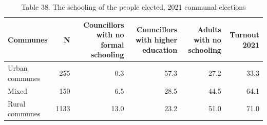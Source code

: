 \begin{table}
\caption{Table 38. The schooling of the people elected, 2021 communal elections}
\label{tab:T38_who_is_elected}
\begin{tabular}{lrrrrr}
\toprule
Communes & N & Councillors with no formal schooling & Councillors with higher education & Adults with no schooling & Turnout 2021 \\
\midrule
Urban communes & 255 & 0.3 & 57.3 & 27.2 & 33.3 \\
Mixed & 150 & 6.5 & 28.5 & 44.5 & 64.1 \\
Rural communes & 1133 & 13.0 & 23.2 & 51.0 & 71.0 \\
\bottomrule
\end{tabular}
\end{table}
